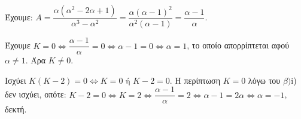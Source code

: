 
\begin{alist}
\item Έχουμε: $A = \dfrac{\alpha(\alpha^2 - 2\alpha + 1)}{\alpha^3 - \alpha^2} = \dfrac{\alpha(\alpha - 1)^2}{\alpha^2(\alpha - 1)} = \dfrac{\alpha - 1}{\alpha}$.

\item 
\begin{rlist}
\item Έχουμε $K = 0 \Leftrightarrow \dfrac{\alpha - 1}{\alpha} = 0 \Leftrightarrow \alpha - 1 = 0 \Leftrightarrow \alpha = 1$, το οποίο απορρίπτεται αφού
$\alpha \ne 1$. Άρα $K \ne 0$.
\item Ισχύει $K(K - 2) = 0 \Leftrightarrow K = 0 \text{ ή } K - 2 = 0$. H περίπτωση $K = 0$ λόγω του $\beta)$i) δεν
ισχύει, οπότε:
$K - 2 = 0 \Leftrightarrow K = 2 \Leftrightarrow \dfrac{\alpha - 1}{\alpha} = 2 \Leftrightarrow \alpha - 1 = 2\alpha \Leftrightarrow \alpha = -1$, δεκτή.
\end{rlist}
\end{alist}

